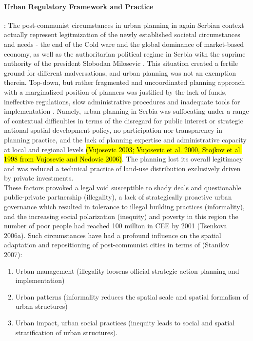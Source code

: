 \documentclass[11pt]{report}
\begin{document}
\paragraph{Urban Regulatory Framework and Practice}:
The post-communist circumstances in urban planning in again Serbian context actually represent legitmization of the newly established societal circumstances and needs - the end of the Cold ware and the global dominance of market-based economy, as well as the authoritarian political regime in Serbia with the suprime authority of the president Slobodan Milosevic \cite{Mornings after Nedovic Budic}. This  situation  created a fertile  ground  for different malversations, and urban planning was not an exemption therein.
Top-down, but rather fragmented and uncoordinated planning approach with a marginalized position of planners was justified by the lack of funds, 
ineffective regulations, slow administrative procedures and inadequate tools for implementation \cite{ref Peric 2016}.
Namely, urban planning in Serbia was suffocating under a range of contextual difficulties in terms of the disregard for public interest or strategic national spatial development policy, no participation nor transparency in planning practice, and the lack of planning expertise and administrative capacity at local and regional levels \hl{(Vujosevic  2003;  Vujosevic et  al. 2000, Stojkov et al. 1998 from Vujosevic and Nedovic 2006)}.
The planning lost its overall legitimacy and was reduced a technical practice of land-use distribution exclusively driven by private investments. 
\\
These factors provoked a legal void susceptible to shady deals and questionable public-private partnership (illegality), a lack of strategically proactive urban governance which resulted in tolerance to illegal building practices (informality), and the increasing social polarization (inequity) and poverty in this region {the number of poor people had reached 100 million in CEE by 2001 (Tsenkova 2006a)}. Such circumstances have had a profound influence on the spatial adaptation and repositioning of post-communist cities in terms of (Stanilov 2007):
\begin{enumerate}
\item Urban management (illegality loosens official strategic action planning and implementation)
\item Urban patterns (informality reduces the spatial scale and spatial formalism of urban structures)
\item Urban impact, urban social practices (inequity leads to social and spatial stratification of urban structures).
\end{enumerate} 
\end{document}
